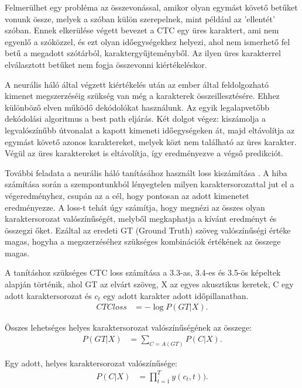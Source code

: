 Felmerülhet egy probléma az összevonással, amikor olyan egymást követő betűket vonunk össze, melyek a szóban külön szerepelnek, mint például az ’ellentét’ szóban. Ennek elkerülése végett bevezet a CTC egy üres karaktert, ami nem egyenlő a szóközzel, és ezt olyan időegységekhez helyezi, ahol nem ismerhető fel betű a megadott szótárból, karaktergyűjteményből. Az ilyen üres karakterrel elválasztott betűket nem fogja összevonni kiértékeléskor.

A neurális háló által végzett kiértékelés után az ember által feldolgozható kimenet megszerzéséig szükség van még a karakterek összeillesztésére. Ehhez különböző elven működő dekódolókat használunk. Az egyik legalapvetőbb dekódolási algoritmus a best path eljárás. Két dolgot végez: kiszámolja a legvalószínűbb útvonalat a kapott kimeneti időegységeken át, majd eltávolítja az egymást követő azonos karaktereket, melyek közt nem található az üres karakter. Végül az üres karaktereket is eltávolítja, így eredményezve a végső predikciót.

További feladata a neurális háló tanításához használt loss kiszámítása \cite{ctc_sid}. A hiba számítása során a szempontunkból lényegtelen milyen karaktersorozattal jut el a végeredményhez, csupán az a cél, hogy pontosan az adott kimenetet eredményezze. A loss-t tehát úgy számítja, hogy megnézi az összes olyan karaktersorozat valószínűségét, melyből megkaphatja a kívánt eredményt és összegzi őket. Ezáltal az eredeti GT (Ground Truth) szöveg valószínűségi értéke magas, hogyha a megszerzéséhez szükséges kombinációk értékének az összege magas.

A tanításhoz szükséges CTC loss számítása a 3.3-as, 3.4-es és 3.5-ös képeltek alapján történik, ahol GT az elvárt szöveg, X az egyes akusztikus keretek, C egy adott karaktersorozat és $c_t$ egy adott karakter adott időpillanatban.
\begin{align}
CTC loss&=-\log{P(GT | X)}.
\end{align}

Összes lehetséges helyes karaktersorozat valószínűségének az összege:
\begin{align}
P(GT | X)&=\sum_{C=A(GT)} P(C | X).
\end{align}

Egy adott, helyes karaktersorozat valószínűsége:
\begin{align}
P(C | X)&=\prod_{t=1}^{T} y(c_t, t)).
\end{align}

